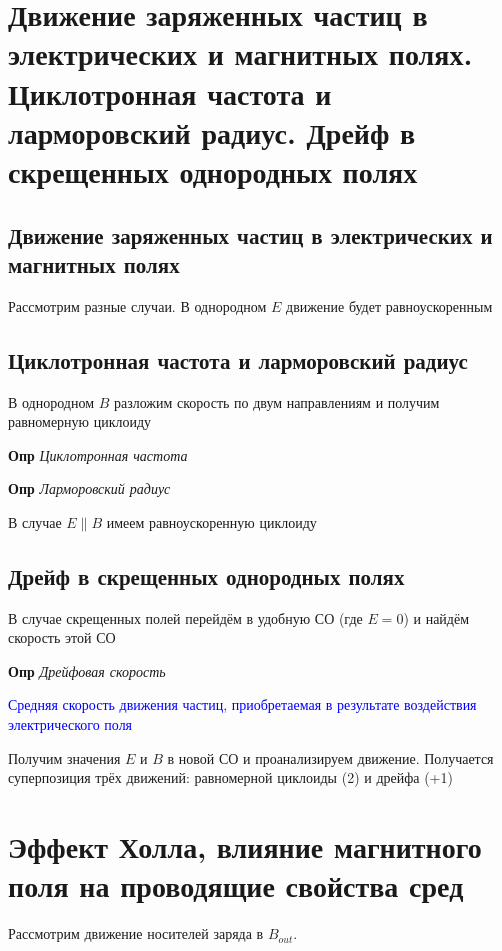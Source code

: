 \documentclass[a4paper, 14pt]{article}
\begin{document}
    \section{Движение заряженных частиц в электрических и магнитных полях.
    Циклотронная частота и ларморовский радиус.
    Дрейф в скрещенных однородных полях}
    
    \subsection{Движение заряженных частиц в электрических и магнитных полях}
    
    Рассмотрим разные случаи.
    В однородном $E$ движение будет равноускоренным
    
    \subsection{Циклотронная частота и ларморовский радиус}
    
    В однородном $B$ разложим скорость по двум направлениям и получим равномерную циклоиду
    
    \textbf{Опр} \textit{Циклотронная частота}
    
    \textbf{Опр} \textit{Ларморовский радиус}
    
    В случае $E \| B$ имеем равноускоренную циклоиду
    
    \subsection{Дрейф в скрещенных однородных полях}
    
    В случае скрещенных полей перейдём в удобную СО (где $E = 0$) и найдём скорость этой СО
    
    \textbf{Опр} \textit{Дрейфовая скорость}
    
    \textcolor{blue}{Средняя скорость движения частиц, приобретаемая в результате воздействия электрического поля}
    
    Получим значения $E$ и $B$ в новой СО и проанализируем движение.
    Получается суперпозиция трёх движений: равномерной циклоиды (2) и дрейфа (+1)
    
    \section{Эффект Холла, влияние магнитного поля на проводящие свойства сред}
    
    Рассмотрим движение носителей заряда в $B_{out}$.
    
\end{document}
